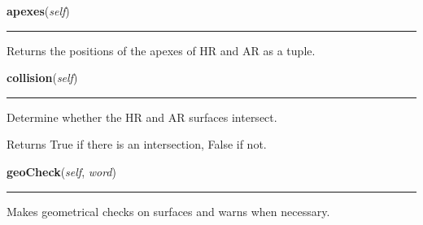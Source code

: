     \label{theia:optics:optic:Optic:apexes}

    \vspace{0.5ex}

\hspace{.8\funcindent}\begin{boxedminipage}{\funcwidth}

    \raggedright \textbf{apexes}(\textit{self})

    \vspace{-1.5ex}

    \rule{\textwidth}{0.5\fboxrule}
\setlength{\parskip}{2ex}
    Returns the positions of the apexes of HR and AR as a tuple.

\setlength{\parskip}{1ex}
    \end{boxedminipage}

    \label{theia:optics:optic:Optic:collision}

    \vspace{0.5ex}

\hspace{.8\funcindent}\begin{boxedminipage}{\funcwidth}

    \raggedright \textbf{collision}(\textit{self})

    \vspace{-1.5ex}

    \rule{\textwidth}{0.5\fboxrule}
\setlength{\parskip}{2ex}
    Determine whether the HR and AR surfaces intersect.

    Returns True if there is an intersection, False if not.

\setlength{\parskip}{1ex}
    \end{boxedminipage}

    \label{theia:optics:optic:Optic:geoCheck}

    \vspace{0.5ex}

\hspace{.8\funcindent}\begin{boxedminipage}{\funcwidth}

    \raggedright \textbf{geoCheck}(\textit{self}, \textit{word})

    \vspace{-1.5ex}

    \rule{\textwidth}{0.5\fboxrule}
\setlength{\parskip}{2ex}
    Makes geometrical checks on surfaces and warns when necessary.

\setlength{\parskip}{1ex}
    \end{boxedminipage}

